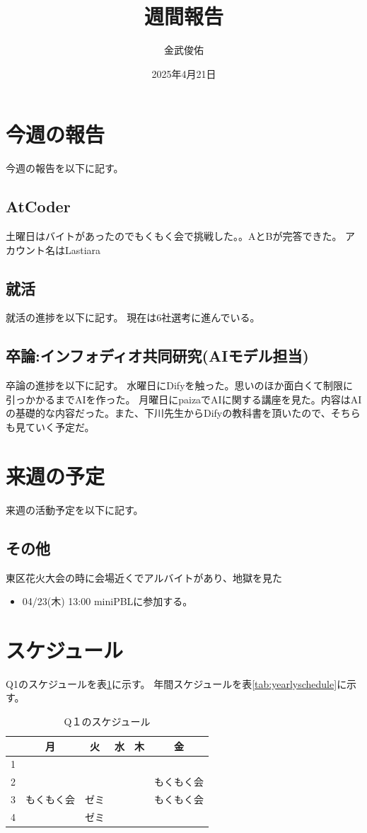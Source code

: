 \documentclass[a4paper,12pt]{ujarticle}
\title{週間報告}
\author{金武俊佑}
\date{2025年4月21日}
\newcommand{\thc}[1]{\multicolumn{1}{c|}{#1}}
\begin{document}
\maketitle

\section{今週の報告}\label{sec:thisweek}
今週の報告を以下に記す。
\subsection{AtCoder}\label{sec:atcoder}
土曜日はバイトがあったのでもくもく会で挑戦した。。AとBが完答できた。
アカウント名はLastiara
\subsection{就活}\label{sec:job}
就活の進捗を以下に記す。
現在は6社選考に進んでいる。
\subsection{卒論:インフォディオ共同研究(AIモデル担当)}\label{sec:thesis}
卒論の進捗を以下に記す。
水曜日にDifyを触った。思いのほか面白くて制限に引っかかるまでAIを作った。
月曜日にpaizaでAIに関する講座を見た。内容はAIの基礎的な内容だった。また、下川先生からDifyの教科書を頂いたので、そちらも見ていく予定だ。
\section{来週の予定}\label{sec:nextweek}
来週の活動予定を以下に記す。
\subsection{その他}\label{sec:other}
東区花火大会の時に会場近くでアルバイトがあり、地獄を見た
\begin{itemize}
  \item 04/23(木) 13:00 miniPBLに参加する。
\end{itemize}


\section{スケジュール}\label{sec:schedule}
Q1のスケジュールを表\ref{tab:studyschedule}に示す。
年間スケジュールを表\ref{tab:yearlyschedule}に示す。

\begin{table}[H]
  \caption{Q１のスケジュール}\label{tab:studyschedule}
  \centering
  \begin{tabular}{|p{4mm}||p{30mm}|p{30mm}|p{30mm}|p{30mm}|p{30mm}|}\hline
        & \thc{月} & \thc{火} & \thc{水} & \thc{木} & \thc{金} \\ \hline\hline
     1  &     &     &     &  &   \\ \hline
     2  &     &  &  &  & もくもく会\\ \hline
     3  & もくもく会  & ゼミ &  & &もくもく会  \\ \hline
     4  &  & ゼミ & &  & \\ \hline
  \end{tabular}
\end{table}
\end{document}
